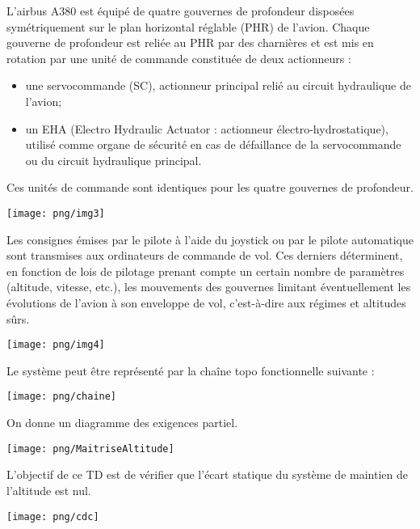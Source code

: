 \documentclass[11pt,oneside]{article}
\begin{document}
{L'airbus A380 est équipé de quatre gouvernes de profondeur disposées symétriquement sur le plan horizontal réglable (PHR) de l'avion. Chaque gouverne de profondeur est reliée au PHR par des charnières et est mis en rotation par une unité de commande constituée de deux actionneurs :
\begin{itemize}
\item une servocommande (SC), actionneur principal relié au circuit hydraulique de l'avion;
\item un EHA (Electro Hydraulic Actuator : actionneur électro-hydrostatique), utilisé comme organe de sécurité en cas de défaillance de la servocommande ou du circuit hydraulique principal.
\end{itemize}

Ces unités de commande sont identiques pour les quatre gouvernes de profondeur.


\begin{center}
\texttt{[image: png/img3]}
\end{center}
\begin{center}
\end{center}

Les consignes émises par le pilote à l'aide du joystick ou par le pilote automatique sont transmises aux ordinateurs de commande de vol. Ces derniers déterminent, en fonction de lois de pilotage prenant compte un certain nombre de paramètres (altitude, vitesse, etc.), les mouvements des gouvernes limitant éventuellement les évolutions de l'avion à son enveloppe de vol, c'est-à-dire aux régimes et altitudes sûrs.


\begin{center}
\texttt{[image: png/img4]}
\end{center}

Le système peut être représenté par la chaîne topo fonctionnelle suivante : 
\begin{center}
\texttt{[image: png/chaine]}
\end{center}
}

\begin{minipage}{.5\linewidth}

On donne un diagramme des exigences partiel.
\begin{center}
\texttt{[image: png/MaitriseAltitude]}
\end{center}
\end{minipage}\hfill
\begin{minipage}{.47\linewidth}

\begin{obj}
L'objectif de ce TD est de vérifier que l'écart statique du système de maintien de l'altitude est nul.

\begin{center}
\texttt{[image: png/cdc]}
\end{center}

\end{obj}
\end{minipage}
\end{document}
